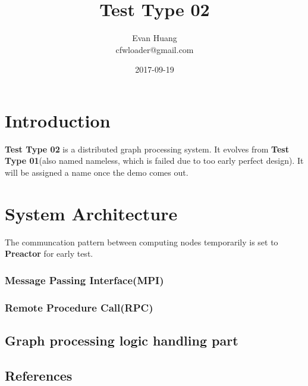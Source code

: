 \documentclass{article}
\title{Test Type 02}
\date{2017-09-19}
\author{Evan Huang \\ cfwloader@gmail.com}
\begin{document}
	\maketitle

	\newpage

	\tableofcontents


	\newpage

	\section{Introduction}
	\textbf{Test Type 02} is a distributed graph processing system. It evolves from \textbf{Test Type 01}(also named nameless, which is failed due to too early perfect design). It will be assigned a name once the demo comes out.

	\section{System Architecture}
	The communcation pattern between computing nodes temporarily is set to \textbf{Preactor} for early test.
	\subsubsection{Message Passing Interface(MPI)}
	\subsubsection{Remote Procedure Call(RPC)}

	\subsection{Graph processing logic handling part}

	\begin{appendix}
		\section{References}
	\end{appendix}
\end{document}
